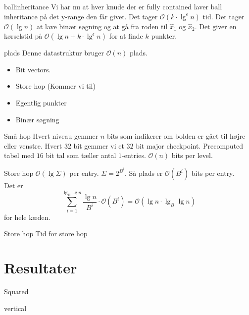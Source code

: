 \documentclass[pdf]{beamer}
\begin{document}
\begin{frame}{ballinheritance}
  Vi har nu at hver knude der er fully contained laver ball inheritance på det y-range den får givet. Det tager $\mathcal{O}(k\cdot\lg^\epsilon n)$ tid. Det tager $\mathcal{O}(\lg n)$ at lave binær søgning og at gå fra roden til $\hat{x}_1$ og $\hat{x}_2$.
  \pause
  Det giver en kørselstid på $\mathcal{O}(\lg n + k\cdot\lg^\epsilon n)$ for at finde $k$ punkter.
\end{frame}

\begin{frame}{plads}
  Denne datastruktur bruger $\mathcal{O}(n)$ plads.
  \begin{itemize}
    \item Bit vectors.
      \pause
    \item Store hop (Kommer vi til)
      \pause
    \item Egentlig punkter
      \pause
    \item Binær søgning
  \end{itemize}
\end{frame}

\begin{frame}{Små hop}
  Hvert niveau gemmer $n$ bits som indikerer om bolden er gået til højre eller venstre. Hvert $32$ bit gemmer vi et $32$ bit major checkpoint. Precomputed tabel med $16$ bit tal som tæller antal $1$-entries. $\mathcal{O}(n)$ bits per level.
\end{frame}

\begin{frame}{Store hop}
  $\mathcal{O}(\lg \Sigma)$ per entry. $\Sigma = 2^{B^i}$. Så plads er $\mathcal{O}(B^i)$ bits per entry.\\

  Det er $$\sum_{i=1}^{\lg_B \lg n} \frac{\lg n}{B^i}\cdot\mathcal{O}(B^i) = \mathcal{O}(\lg n \cdot \lg_B \lg n)$$ for hele kæden.
\end{frame}

\begin{frame}{Store hop}
  Tid for store hop
\end{frame}

\section{Resultater}

\begin{frame}{Squared}

\end{frame}


\begin{frame}{vertical}

\end{frame}
\end{document}
